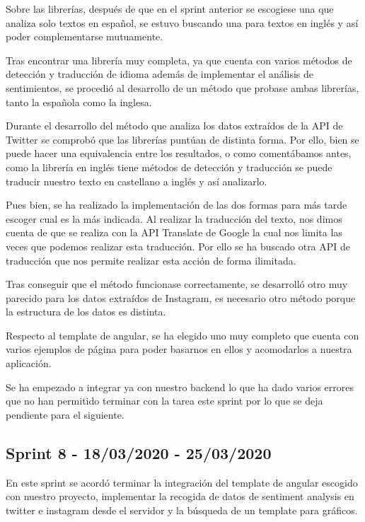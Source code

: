 Sobre las librerías, después de que en el sprint anterior se escogiese una que analiza solo textos en español, se estuvo buscando una para textos en inglés y así poder complementarse mutuamente.

Tras encontrar una librería muy completa, ya que cuenta con varios métodos de detección y traducción de idioma además de implementar el análisis de sentimientos, se procedió al desarrollo de un método que probase ambas librerías, tanto la española como la inglesa.

Durante el desarrollo del método que analiza los datos extraídos de la API de Twitter se comprobó que las librerías puntúan de distinta forma. Por ello, bien se puede hacer una equivalencia entre los resultados, o como comentábamos antes, como la librería en inglés tiene métodos de detección y traducción se puede traducir nuestro texto en castellano a inglés y así analizarlo.

Pues bien, se ha realizado la implementación de las dos formas para más tarde escoger cual es la más indicada. 
Al realizar la traducción del texto, nos dimos cuenta de que se realiza con la API Translate de Google la cual nos limita las veces que podemos realizar esta traducción. Por ello se ha buscado otra API de traducción que nos permite realizar esta acción de forma ilimitada.

Tras conseguir que el método funcionase correctamente, se desarrolló otro muy parecido para los datos extraídos de Instagram, es necesario otro método porque la estructura de los datos es distinta.

Respecto al template de angular, se ha elegido uno muy completo que cuenta con varios ejemplos de página para poder basarnos en ellos y acomodarlos a nuestra aplicación.

Se ha empezado a integrar ya con nuestro backend lo que ha dado varios errores que no han permitido terminar con la tarea este sprint por lo que se deja pendiente para el siguiente.



\subsection{Sprint 8 - 18/03/2020 - 25/03/2020}
En este sprint se acordó terminar la integración del template de angular escogido con nuestro proyecto, implementar la recogida de datos de sentiment analysis en twitter e instagram desde el servidor y la búsqueda de un template para gráficos.

